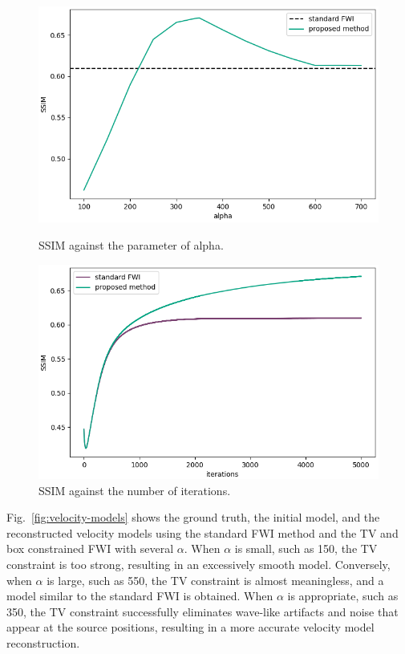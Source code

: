 \begin{figure}[htbp]
    \centering
    \begin{minipage}{80mm}
        \centering
        \includegraphics[width=\linewidth]{public/alpha-ssim}
        \caption{SSIM against the parameter of alpha.}
        \label{fig:alpha-ssim}
    \end{minipage}
    \hspace{10mm}
    \begin{minipage}{80mm}
        \centering
        \includegraphics[width=\linewidth]{public/iters-ssim}
        \caption{SSIM against the number of iterations.}
        \label{fig:iters-ssim}
    \end{minipage}
\end{figure}

Fig.~\ref{fig:velocity-models} shows the ground truth, the initial model, and the reconstructed velocity models using the standard FWI method and the TV and box constrained FWI with several $\alpha$.
When $\alpha$ is small, such as 150, the TV constraint is too strong, resulting in an excessively smooth model.
Conversely, when $\alpha$ is large, such as 550, the TV constraint is almost meaningless, and a model similar to the standard FWI is obtained.
When $\alpha$ is appropriate, such as 350, the TV constraint successfully eliminates wave-like artifacts and noise that appear at the source positions, resulting in a more accurate velocity model reconstruction.

